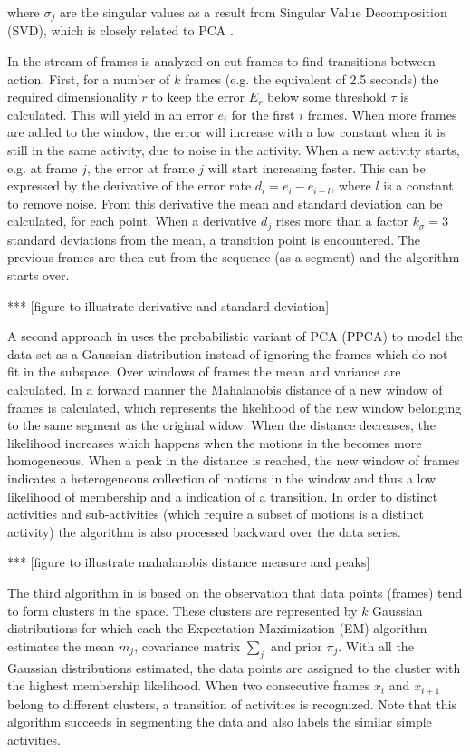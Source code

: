where $\sigma_j$ are the singular values as a result from Singular Value Decomposition (SVD), which is closely related to PCA \cite{shlens2005tutorial}.

In \cite{barbivc2004segmenting} the stream of frames is analyzed on cut-frames to find transitions between action.
First, for a number of $k$ frames (e.g. the equivalent of 2.5 seconds) the required dimensionality $r$ to keep the error $E_r$ below some threshold $\tau$ is calculated.
This will yield in an error $e_i$ for the first $i$ frames.
When more frames are added to the window, the error will increase with a low constant when it is still in the same activity, due to noise in the activity.
When a new activity starts, e.g. at frame $j$, the error at frame $j$ will start increasing faster.
This can be expressed by the derivative of the error rate $d_i = e_i - e_{i-l}$, where $l$ is a constant to remove noise.
From this derivative the mean and standard deviation can be calculated, for each point.
When a derivative $d_j$ rises more than a factor $k_\sigma = 3$ standard deviations from the mean, a transition point is encountered.
The previous frames are then cut from the sequence (as a segment) and the algorithm starts over.

*** [figure to illustrate derivative and standard deviation]

A second approach in \cite{barbivc2004segmenting} uses the probabilistic variant of PCA (PPCA) to model the data set as a Gaussian distribution instead of ignoring the frames which do not fit in the subspace.
Over windows of frames the mean and variance are calculated.
In a forward manner the Mahalanobis distance of a new window of frames is calculated, which represents the likelihood of the new window belonging to the same segment as the original widow.
When the distance decreases, the likelihood increases which happens when the motions in the becomes more homogeneous.
When a peak in the distance is reached, the new window of frames indicates a heterogeneous collection of motions in the window and thus a low likelihood of membership and a indication of a transition.
In order to distinct activities and sub-activities (which require a subset of motions is a distinct activity) the algorithm is also processed backward over the data series.

*** [figure to illustrate mahalanobis distance measure and peaks]

The third algorithm in \cite{barbivc2004segmenting} is based on the observation that data points (frames) tend to form clusters in the space.
These clusters are represented by $k$ Gaussian distributions for which each the Expectation-Maximization (EM) algorithm estimates the mean $m_j$, covariance matrix $\sum_{j}$ and prior $\pi_j$.
With all the Gaussian distributions estimated, the data points are assigned to the cluster with the highest membership likelihood.
When two consecutive frames $x_i$ and $x_{i+1}$ belong to different clusters, a transition of activities is recognized.
Note that this algorithm succeeds in segmenting the data and also labels the similar simple activities.

